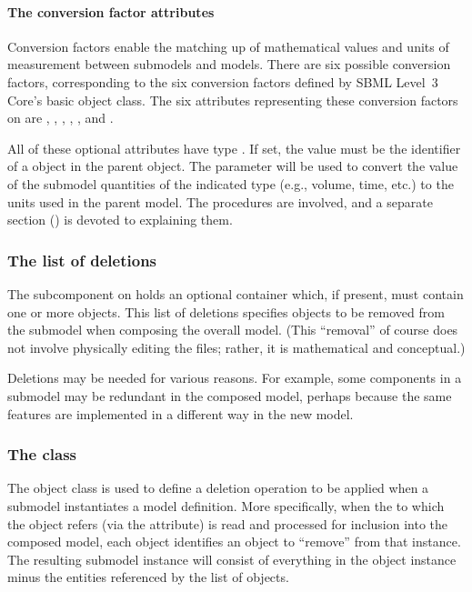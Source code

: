 \paragraph{The conversion factor attributes}

Conversion factors enable the matching up of mathematical values and
units of measurement between submodels and models.  There are six
possible conversion factors, corresponding to the six conversion factors
defined by SBML Level~3 Core's basic \Model object class.  The six
attributes representing these conversion factors on \Submodel are
, ,
, ,
, and .

All of these optional attributes have type .  If set,
the value must be the identifier of a \Parameter object in the parent
\Model object.  The parameter will be used to convert the value of the
submodel quantities of the indicated type (e.g., volume, time, etc.) to
the units used in the parent model.  The procedures are involved, and a
separate section () is devoted to explaining
them.


\subsubsection{The list of deletions}
\label{listofdeletions}

The  subcomponent on \Submodel holds an optional
\ListOfDeletions container which, if present, must contain one or more
\Deletion objects.  This list of deletions specifies objects to be
removed from the submodel when composing the overall model.  (This
``removal'' of course does not involve physically editing the files;
rather, it is mathematical and conceptual.)

Deletions may be needed for various reasons.  For example, some
components in a submodel may be redundant in the composed model, perhaps
because the same features are implemented in a different way in the
new model.


\subsubsection{The  class}
\label{deletion-class}

The \Deletion object class is used to define a deletion operation to be
applied when a submodel instantiates a model definition.  More
specifically, when the \Model to which the \Submodel object refers (via
the  attribute) is read and processed for inclusion into
the composed model, each \Deletion object identifies an object to
``remove'' from that \Model instance.  The resulting submodel instance
will consist of everything in the \Model object instance minus the
entities referenced by the list of \Deletion objects.

